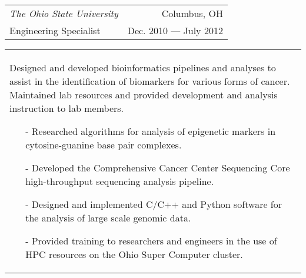\begin{tabularx}{\textwidth}{ L R }
    \normalsize\textit{The Ohio State University} & Columbus, OH \\
    Engineering Specialist & Dec. 2010 --- July 2012 \\
\end{tabularx}
\begin{tabularx}{\textwidth}{ X }
    \vspace{1pt}
    Designed and developed bioinformatics pipelines and analyses to assist in the identification of biomarkers for various forms of cancer. Maintained lab resources and provided development and analysis instruction to lab members.
    \begin{itemize}
        \itemsep{}
        \item[-] Researched algorithms for analysis of epigenetic markers in cytosine-guanine base pair complexes.
        \item[-] Developed the Comprehensive Cancer Center Sequencing Core high-throughput sequencing analysis pipeline.
        \item[-] Designed and implemented C/C++ and Python software for the analysis of large scale genomic data.
        \item[-] Provided training to researchers and engineers in the use of HPC resources on the Ohio Super Computer cluster.
    \end{itemize}
\end{tabularx}
